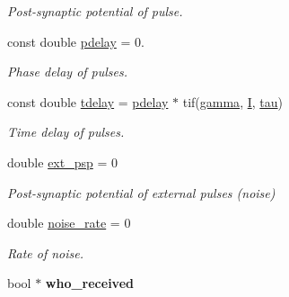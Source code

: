 \begin{DoxyCompactItemize}
\begin{DoxyCompactList}\small\item\em Post-\/synaptic potential of pulse. \end{DoxyCompactList}\item 
\hypertarget{classLifNetSim_a423c0059e568c60977e12b9e0bfbb557}{const double \hyperlink{classLifNetSim_a423c0059e568c60977e12b9e0bfbb557}{pdelay} = 0.}\label{classLifNetSim_a423c0059e568c60977e12b9e0bfbb557}

\begin{DoxyCompactList}\small\item\em Phase delay of pulses. \end{DoxyCompactList}\item 
\hypertarget{classLifNetSim_a96b99bdbae7fbcc0b096074140cd2586}{const double \hyperlink{classLifNetSim_a96b99bdbae7fbcc0b096074140cd2586}{tdelay} = \hyperlink{classLifNetSim_a423c0059e568c60977e12b9e0bfbb557}{pdelay} $\ast$ tif(\hyperlink{classLifNetSim_abc773998c942f9eff71eb4a048ea8902}{gamma}, \hyperlink{classLifNetSim_acab972029d8f56327aa925db344feae6}{I}, \hyperlink{classLifNetSim_a2c7ce3fdae67e8ba8d07990fa61e951c}{tau})}\label{classLifNetSim_a96b99bdbae7fbcc0b096074140cd2586}

\begin{DoxyCompactList}\small\item\em Time delay of pulses. \end{DoxyCompactList}\item 
\hypertarget{classLifNetSim_a4fd0ebbe8a95e62430b3054ffe564662}{double \hyperlink{classLifNetSim_a4fd0ebbe8a95e62430b3054ffe564662}{ext\-\_\-psp} = 0}\label{classLifNetSim_a4fd0ebbe8a95e62430b3054ffe564662}

\begin{DoxyCompactList}\small\item\em Post-\/synaptic potential of external pulses (noise) \end{DoxyCompactList}\item 
\hypertarget{classLifNetSim_aa4075d2e5e5432a5e058c4fd7997bbea}{double \hyperlink{classLifNetSim_aa4075d2e5e5432a5e058c4fd7997bbea}{noise\-\_\-rate} = 0}\label{classLifNetSim_aa4075d2e5e5432a5e058c4fd7997bbea}

\begin{DoxyCompactList}\small\item\em Rate of noise. \end{DoxyCompactList}\item 
\hypertarget{classLifNetSim_ab154eca0f462efb88f46923ca2c58384}{bool $\ast$ {\bfseries who\-\_\-received}}\label{classLifNetSim_ab154eca0f462efb88f46923ca2c58384}


\end{DoxyCompactItemize}
